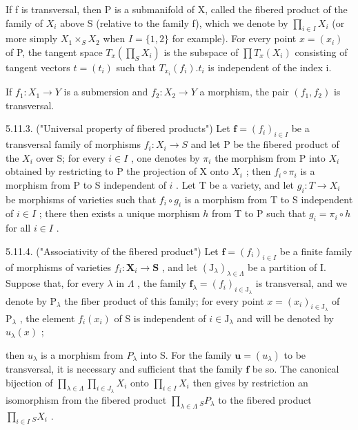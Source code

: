 If f is transversal, then P is a submanifold of X, called the fibered product of the family of \(X_{i}\) above S (relative to the family f), which we denote by \(\prod_{i\in I}X_{i}\) (or more simply \(X_{1}\times_{S}X_{2}\) when \(I=\{1,2\}\) for example). For every point \(x=(x_{i})\) of P, the tangent space \(T_{x}(\prod_{S}X_{i})\) is the subspace of \(\prod T_{x}(X_{i})\) consisting of tangent vectors \(t=(t_{i})\) such that \(T_{x_{i}}(f_{i}).t_{i}\) is independent of the index i.

If \(f_{1}: X_{1} \to Y\) is a submersion and \(f_{2}: X_{2} \to Y\) a morphism, the pair \((f_{1}, f_{2})\) is transversal.

5.11.3. ("Universal property of fibered products") Let \(\mathbf{f} = (f_i)_{i \in I}\) be a transversal family of morphisms \(f_i: X_i \to S\) and let P be the fibered product of the \(X_i\) over S; for every \(i \in I\) , one denotes by \(\pi_i\) the morphism from P into \(X_i\) obtained by restricting to P the projection of X onto \(X_i\) ; then \(f_i \circ \pi_i\) is a morphism from P to S independent of \(i\) . Let T be a variety, and let \(g_i: T \to X_i\) be morphisms of varieties such that \(f_i \circ g_i\) is a morphism from T to S independent of \(i \in I\) ; there then exists a unique morphism \(h\) from T to P such that \(g_i = \pi_i \circ h\) for all \(i \in I\) .

5.11.4. ("Associativity of the fibered product") Let \(\mathbf{f} = (f_i)_{i \in I}\) be a finite family of morphisms of varieties \(f_i: \mathbf{X}_i \to \mathbf{S}\) , and let \((\mathrm{J}_{\lambda})_{\lambda \in \Lambda}\) be a partition of I. Suppose that, for every \(\lambda\) in \(\Lambda\) , the family \(\mathbf{f}_{\lambda} = (f_i)_{i \in \mathrm{J}_{\lambda}}\) is transversal, and we denote by \(\mathrm{P}_{\lambda}\) the fiber product of this family; for every point \(x = (x_i)_{i \in \mathrm{J}_{\lambda}}\) of \(\mathrm{P}_{\lambda}\) , the element \(f_i(x_i)\) of S is independent of \(i \in \mathrm{J}_{\lambda}\) and will be denoted by \(u_{\lambda}(x)\) ;

then \(u_{\lambda}\) is a morphism from \(P_{\lambda}\) into S. For the family \(\mathbf{u} = (u_{\lambda})\) to be transversal, it is necessary and sufficient that the family \(\mathbf{f}\) be so. The canonical bijection of \(\prod_{\lambda \in \Lambda} \prod_{i \in J_{\lambda}} X_i\) onto \(\prod_{i \in I} X_i\) then gives by restriction an isomorphism from the fibered product \(\prod_{\lambda \in \Lambda} {}_{S}P_{\lambda}\) to the fibered product \(\prod_{i \in I} {}_{S}X_i\) .

